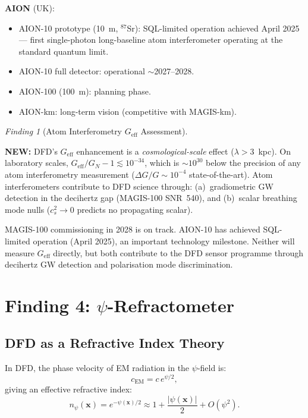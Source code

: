\documentclass[11pt]{article}
\theoremstyle{definition}
\theoremstyle{remark}
\newtheorem{finding}[theorem]{Finding}
\newcommand{\Geff}{G_{\mathrm{eff}}}
\newcommand{\newresult}[1]{\textcolor{green!50!black}{\textbf{NEW:} #1}}
\begin{document}
\textbf{AION} (UK):
\begin{itemize}[nosep]
\item AION-10 prototype (10~m, $^{87}$Sr): SQL-limited operation
  achieved April 2025 --- first single-photon long-baseline
  atom interferometer operating at the standard quantum limit.
\item AION-10 full detector: operational $\sim$2027--2028.
\item AION-100 (100~m): planning phase.
\item AION-km: long-term vision (competitive with MAGIS-km).
\end{itemize}

\begin{finding}[Atom Interferometry $\Geff$ Assessment]
\label{find:ai}
\newresult{DFD's $\Geff$ enhancement is a \emph{cosmological-scale}
effect ($\lambda > 3$~kpc).  On laboratory scales, $\Geff/G_N - 1
\lesssim 10^{-34}$, which is $\sim 10^{30}$ below the precision of
any atom interferometry measurement ($\Delta G/G \sim 10^{-4}$
state-of-the-art).  Atom interferometers contribute to DFD
science through: (a)~gradiometric GW detection in the decihertz
gap (MAGIS-100 SNR~540), and (b)~scalar breathing mode nulls
($c_s^2 \to 0$ predicts no propagating scalar).

MAGIS-100 commissioning in 2028 is on track.  AION-10 has
achieved SQL-limited operation (April 2025), an important
technology milestone.  Neither will measure $\Geff$ directly,
but both contribute to the DFD sensor programme through
decihertz GW detection and polarisation mode discrimination.}
\end{finding}

\section{Finding 4: $\psi$-Refractometer}
\label{sec:refractometer}

\subsection{DFD as a Refractive Index Theory}

In DFD, the phase velocity of EM radiation in the $\psi$-field is:
\begin{equation}
c_{\mathrm{EM}} = c\,e^{\psi/2},
\end{equation}
giving an effective refractive index:
\begin{equation}
n_\psi(\mathbf{x}) = e^{-\psi(\mathbf{x})/2}
  \approx 1 + \frac{|\psi(\mathbf{x})|}{2}
  + O(\psi^2).
\end{equation}
\end{document}
